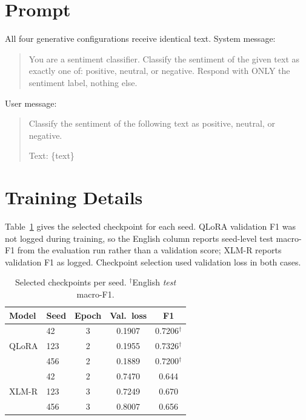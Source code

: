 \documentclass[11pt]{article}
\begin{document}
\section{Prompt}
\label{app:prompt}
All four generative configurations receive identical text. System message:

\begin{quote}\small\ttfamily
You are a sentiment classifier. Classify the sentiment of the given text as
exactly one of: positive, neutral, or negative. Respond with ONLY the sentiment
label, nothing else.
\end{quote}

\noindent User message:

\begin{quote}\small\ttfamily
Classify the sentiment of the following text as positive, neutral, or negative.

Text: \{text\}
\end{quote}

\section{Training Details}
\label{app:training}

Table~\ref{tab:seeds} gives the selected checkpoint for each seed. QLoRA
validation F1 was not logged during training, so the English column reports
seed-level test macro-F1 from the evaluation run rather than a validation score;
\mbox{XLM-R} reports validation F1 as logged. Checkpoint selection used validation loss
in both cases.

\begin{table}[H]
\centering\small
\setlength{\tabcolsep}{4pt}
\begin{tabular}{@{}llccc@{}}
\toprule
Model & Seed & Epoch & Val.\ loss & F1 \\
\midrule
\multirow{3}{*}{QLoRA}
 & 42  & 3 & 0.1907 & 0.7206$^{\dagger}$ \\
 & 123 & 2 & 0.1955 & 0.7326$^{\dagger}$ \\
 & 456 & 2 & 0.1889 & 0.7200$^{\dagger}$ \\
\midrule
\multirow{3}{*}{XLM-R}
 & 42  & 2 & 0.7470 & 0.644 \\
 & 123 & 3 & 0.7249 & 0.670 \\
 & 456 & 3 & 0.8007 & 0.656 \\
\bottomrule
\end{tabular}
\caption{Selected checkpoints per seed. $^{\dagger}$English \emph{test} macro-F1.}
\label{tab:seeds}
\end{table}
\end{document}
